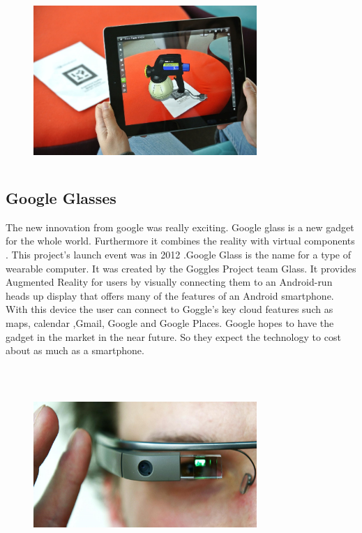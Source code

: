 \begin{figure}[H]
\centering
\includegraphics[width=240pt,height=180pt,keepaspectratio]{graphics/ARpad.png}
\caption{\cite{javaObjectClass}}
\end{figure}
\subsection{Google Glasses}
The new innovation from google was really exciting. Google glass is a new gadget for the whole world. Furthermore it combines the reality with virtual components . This project's launch event was in 2012 .Google Glass is the name for a type of wearable computer. It was created by the Goggles Project team Glass. It provides Augmented Reality for users by visually connecting them to an Android-run heads up display that offers many of the features of an Android smartphone. With this device the user can connect to Goggle's key cloud features such as maps, calendar ,Gmail, Google and Google Places. Google hopes to have the gadget in the market in the near future. So they expect the technology to cost about as much as a smartphone. 
\\
\\
\begin{figure}[H]
\centering
\includegraphics[width=240pt,height=180pt,keepaspectratio]{graphics/GoogleGlasses.jpg}
\caption{\cite{javaObjectClass}}
\end{figure}
